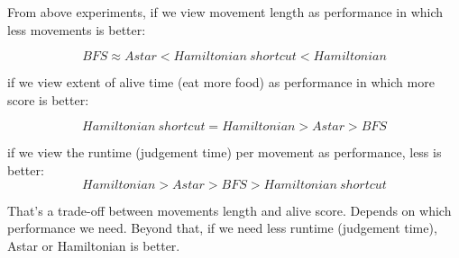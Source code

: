 \documentclass[12pt]{article}
\begin{document}
From above experiments, if we view movement length as performance in which less movements is better:

      $$BFS \approx A star < Hamiltonian\ shortcut < Hamiltonian$$
     
if we view extent of alive time (eat more food) as performance in which more score is better:
       
       $$Hamiltonian\ shortcut = Hamiltonian > Astar > BFS$$
       
if we view the runtime (judgement time) per movement as performance, less is better:
      $$Hamiltonian > A star > BFS > Hamiltonian\ shortcut$$
      
That's a trade-off between movements length and alive score. Depends on which performance we need. Beyond that, if we need less runtime (judgement time), Astar or Hamiltonian is better.
\end{document}
